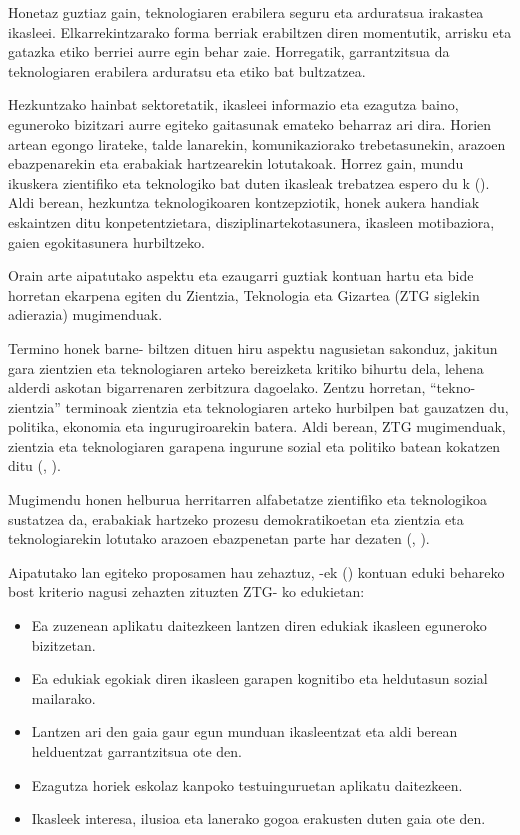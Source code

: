 Honetaz guztiaz gain, teknologiaren erabilera seguru eta arduratsua irakastea ikasleei. Elkarrekintzarako forma berriak erabiltzen diren momentutik, arrisku eta gatazka etiko berriei aurre egin behar zaie. Horregatik, garrantzitsua da teknologiaren erabilera arduratsu eta etiko bat bultzatzea. 

Hezkuntzako hainbat sektoretatik, ikasleei informazio eta ezagutza baino, eguneroko bizitzari aurre egiteko gaitasunak emateko beharraz ari dira. Horien artean egongo lirateke, talde lanarekin, komunikaziorako trebetasunekin, arazoen ebazpenarekin eta erabakiak hartzearekin lotutakoak. Horrez gain, mundu ikuskera zientifiko eta teknologiko bat duten ikasleak trebatzea espero du \citeauthor{acevedo1998ciencia}k (\citeyear{acevedo1998ciencia}). Aldi berean, hezkuntza teknologikoaren kontzepziotik, honek aukera handiak eskaintzen ditu konpetentzietara, disziplinartekotasunera, ikasleen motibaziora, gaien egokitasunera hurbiltzeko.

Orain arte aipatutako aspektu eta ezaugarri guztiak kontuan hartu eta bide horretan ekarpena egiten du Zientzia, Teknologia eta Gizartea (ZTG siglekin adierazia) mugimenduak.

Termino honek barne- biltzen dituen hiru aspektu nagusietan sakonduz, jakitun gara zientzien eta teknologiaren arteko bereizketa kritiko bihurtu dela, lehena alderdi askotan bigarrenaren zerbitzura dagoelako. Zentzu horretan, “tekno- zientzia” terminoak zientzia eta teknologiaren arteko hurbilpen bat gauzatzen du, politika, ekonomia eta ingurugiroarekin batera. Aldi berean, ZTG mugimenduak, zientzia eta teknologiaren garapena ingurune sozial eta politiko batean kokatzen ditu (\citeauthor{osorio2002educacion}, \citeyear{osorio2002educacion}).

Mugimendu honen helburua herritarren alfabetatze zientifiko eta teknologikoa sustatzea da, erabakiak hartzeko prozesu demokratikoetan eta zientzia eta teknologiarekin lotutako arazoen ebazpenetan parte har dezaten (\citeauthor{membiela1997revision}, \citeyear{membiela1997revision}).

Aipatutako lan egiteko proposamen hau zehaztuz, \citeauthor{hickman1987science}-ek (\citeyear{hickman1987science}) kontuan eduki behareko bost kriterio nagusi zehazten zituzten ZTG- ko edukietan:

\begin{itemize}
    \item Ea zuzenean aplikatu daitezkeen lantzen diren edukiak ikasleen eguneroko bizitzetan.
    \item Ea edukiak egokiak diren ikasleen garapen kognitibo eta heldutasun sozial mailarako.
    \item Lantzen ari den gaia gaur egun munduan ikasleentzat eta aldi berean helduentzat garrantzitsua ote den.
    \item Ezagutza horiek eskolaz kanpoko testuinguruetan aplikatu daitezkeen.
    \item Ikasleek interesa, ilusioa eta lanerako gogoa erakusten duten gaia ote den.
\end{itemize}


